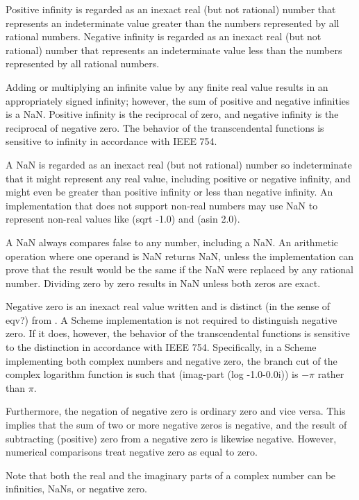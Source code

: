 Positive infinity is regarded as an inexact real (but not rational)
number that represents an indeterminate value greater than the
numbers represented by all rational numbers. Negative infinity
is regarded as an inexact real (but not rational) number that
represents an indeterminate value less than the numbers represented
by all rational numbers.

Adding or multiplying an infinite value by any finite real value results
in an appropriately signed infinity; however, the sum of positive and
negative infinities is a NaN.  Positive infinity is the reciprocal
of zero, and negative infinity is the reciprocal of negative zero.
The behavior of the transcendental functions is sensitive to infinity
in accordance with IEEE 754.

A NaN is regarded as an inexact real (but not rational) number
so indeterminate that it might represent any real value, including
positive or negative infinity, and might even be greater than positive
infinity or less than negative infinity.
An implementation that does not support non-real numbers may use NaN
to represent non-real values like {\cf (sqrt -1.0)} and {\cf (asin 2.0)}.

A NaN always compares false to any number, including a NaN.
An arithmetic operation where one operand is NaN returns NaN, unless the
implementation can prove that the result would be the same if the NaN
were replaced by any rational number.  Dividing zero by zero results in
NaN unless both zeros are exact.

Negative zero is an inexact real value written {} and is distinct
(in the sense of {\cf eqv?}) from {}.  A Scheme implementation
is not required to distinguish negative zero.  If it does, however, the
behavior of the transcendental functions is sensitive to the distinction
in accordance with IEEE 754.
Specifically, in a Scheme implementing both complex numbers and negative zero,
the branch cut of the complex logarithm function is such that
{\cf (imag-part (log -1.0-0.0i))} is $-\pi$ rather than $\pi$.

Furthermore, the negation of negative zero is ordinary zero and vice
versa.  This implies that the sum of two or more negative zeros is negative,
and the result of subtracting (positive) zero from a negative zero is
likewise negative.  However, numerical comparisons treat negative zero
as equal to zero.

Note that both the real and the imaginary parts of a complex number
can be infinities, NaNs, or negative zero.

